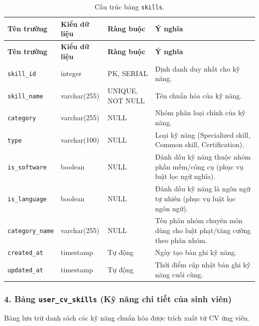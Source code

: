 \begin{footnotesize}\begin{longtable}{|L{3.5cm}|L{2.0cm}|L{3.0cm}|L{5.5cm}|}
\caption{Cấu trúc bảng \texttt{skills}.}
\label{tab:skills} \\
\hline
\textbf{Tên trường} & \textbf{Kiểu dữ liệu} & \textbf{Ràng buộc} & \textbf{Ý nghĩa} \\
\hline
\endfirsthead
\hline
\textbf{Tên trường} & \textbf{Kiểu dữ liệu} & \textbf{Ràng buộc} & \textbf{Ý nghĩa} \\
\hline
\endhead
\texttt{skill\_id} & integer & PK, SERIAL & Định danh duy nhất cho kỹ năng. \\
\hline
\texttt{skill\_name} & varchar(255) & UNIQUE, NOT NULL & Tên chuẩn hóa của kỹ năng. \\
\hline
\texttt{category} & varchar(255) & NULL & Nhóm phân loại chính của kỹ năng. \\
\hline
\texttt{type} & varchar(100) & NULL & Loại kỹ năng (Specialized skill, Common skill, Certification). \\
\hline
\texttt{is\_software} & boolean & NULL & Đánh dấu kỹ năng thuộc nhóm phần mềm/công cụ (phục vụ luật lọc ngữ nghĩa). \\
\hline
\texttt{is\_language} & boolean & NULL & Đánh dấu kỹ năng là ngôn ngữ tự nhiên (phục vụ luật lọc ngôn ngữ). \\
\hline
\texttt{category\_\allowbreak name} & varchar(255) & NULL & Tên phân nhóm chuyên môn dùng cho luật phạt/tăng cường theo phân nhóm. \\
\hline
\texttt{created\_at} & timestamp & Tự động & Ngày tạo bản ghi kỹ năng. \\
\hline
\texttt{updated\_at} & timestamp & Tự động & Thời điểm cập nhật bản ghi kỹ năng cuối cùng. \\
\hline
\end{longtable}
\end{footnotesize}

\subsubsection*{4. Bảng \texttt{user\_\allowbreak cv\_\allowbreak skills} (Kỹ năng chi tiết của sinh viên)}

Bảng lưu trữ danh sách các kỹ năng chuẩn hóa được trích xuất từ CV ứng viên.

